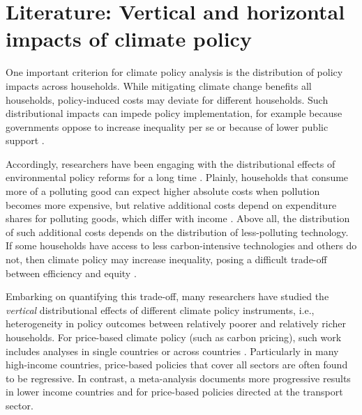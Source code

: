 \documentclass[12pt, a4paper]{article}
\begin{document}
\section{Literature: Vertical and horizontal impacts of climate policy} \label{sec:literature}

One important criterion for climate policy analysis is the distribution of policy impacts across households. While mitigating climate change benefits all households, policy-induced costs may deviate for different households. Such distributional impacts can impede policy implementation, for example because governments oppose to increase inequality per se or because of lower public support \autocite{Bergquist.2022,Douenne.2022}. 

Accordingly, researchers have been engaging with the distributional effects of environmental policy reforms for a long time \autocite{Cremer.2003,Poterba.1991,Sandmo.1975,Stiglitz.2019}. Plainly, households that consume more of a polluting good can expect higher absolute costs when pollution becomes more expensive, but relative additional costs depend on expenditure shares for polluting goods, which differ with income \autocite{Jacobs.2019,Dorband.2019}. Above all, the distribution of such additional costs depends on the distribution of less-polluting technology. If some households have access to less carbon-intensive technologies and others do not, then climate policy may increase inequality, posing a difficult trade-off between efficiency and equity \autocite{Hansel.2022,TerryDinan.2016}. 

Embarking on quantifying this trade-off, many researchers have studied the \textit{vertical} distributional effects of different climate policy instruments, i.e., heterogeneity in policy outcomes between relatively poorer and relatively richer households. For price-based climate policy (such as carbon pricing), such work includes analyses in single countries \autocite{Goulder.2019,Grainger.2010,Rausch.2011,Garaffa.2021,Sterner.2012,Wu.2022} or across countries \autocite{Budolfson.2021,Feindt.2021,Dorband.2019,Steckel.2021b,VogtSchilb.2019,Missbach.2024}. Particularly in many high-income countries, price-based policies that cover all sectors are often found to be regressive. In contrast, a meta-analysis \autocite{Ohlendorf.2021} documents more progressive results in lower income countries and for price-based policies directed at the transport sector.
\end{document}
